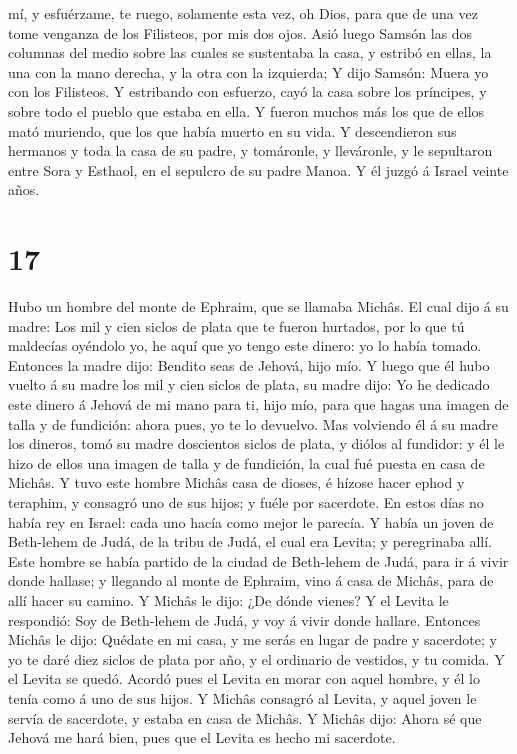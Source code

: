 mí, y esfuérzame, te ruego, solamente esta vez, oh Dios, para que de una
vez tome venganza de los Filisteos, por mis dos ojos.  Asió
luego Samsón las dos columnas del medio sobre las cuales se sustentaba
la casa, y estribó en ellas, la una con la mano derecha, y la otra con
la izquierda;  Y dijo Samsón: Muera yo con los Filisteos. Y
estribando con esfuerzo, cayó la casa sobre los príncipes, y sobre todo
el pueblo que estaba en ella. Y fueron muchos más los que de ellos mató
muriendo, que los que había muerto en su vida.  Y
descendieron sus hermanos y toda la casa de su padre, y tomáronle, y
lleváronle, y le sepultaron entre Sora y Esthaol, en el sepulcro de su
padre Manoa. Y él juzgó á Israel veinte años.

\hypertarget{section-16}{%
\section{17}\label{section-16}}

 Hubo un hombre del monte de Ephraim, que se llamaba Michâs.
 El cual dijo á su madre: Los mil y cien siclos de plata que
te fueron hurtados, por lo que tú maldecías oyéndolo yo, he aquí que yo
tengo este dinero: yo lo había tomado. Entonces la madre dijo: Bendito
seas de Jehová, hijo mío.  Y luego que él hubo vuelto á su
madre los mil y cien siclos de plata, su madre dijo: Yo he dedicado este
dinero á Jehová de mi mano para ti, hijo mío, para que hagas una imagen
de talla y de fundición: ahora pues, yo te lo devuelvo.  Mas
volviendo él á su madre los dineros, tomó su madre doscientos siclos de
plata, y diólos al fundidor: y él le hizo de ellos una imagen de talla y
de fundición, la cual fué puesta en casa de Michâs.  Y tuvo
este hombre Michâs casa de dioses, é hízose hacer ephod y teraphim, y
consagró uno de sus hijos; y fuéle por sacerdote.  En estos
días no había rey en Israel: cada uno hacía como mejor le parecía.
 Y había un joven de Beth-lehem de Judá, de la tribu de
Judá, el cual era Levita; y peregrinaba allí.  Este hombre
se había partido de la ciudad de Beth-lehem de Judá, para ir á vivir
donde hallase; y llegando al monte de Ephraim, vino á casa de Michâs,
para de allí hacer su camino.  Y Michâs le dijo: ¿De dónde
vienes? Y el Levita le respondió: Soy de Beth-lehem de Judá, y voy á
vivir donde hallare.  Entonces Michâs le dijo: Quédate en
mi casa, y me serás en lugar de padre y sacerdote; y yo te daré diez
siclos de plata por año, y el ordinario de vestidos, y tu comida. Y el
Levita se quedó.  Acordó pues el Levita en morar con aquel
hombre, y él lo tenía como á uno de sus hijos.  Y Michâs
consagró al Levita, y aquel joven le servía de sacerdote, y estaba en
casa de Michâs.  Y Michâs dijo: Ahora sé que Jehová me hará
bien, pues que el Levita es hecho mi sacerdote.

